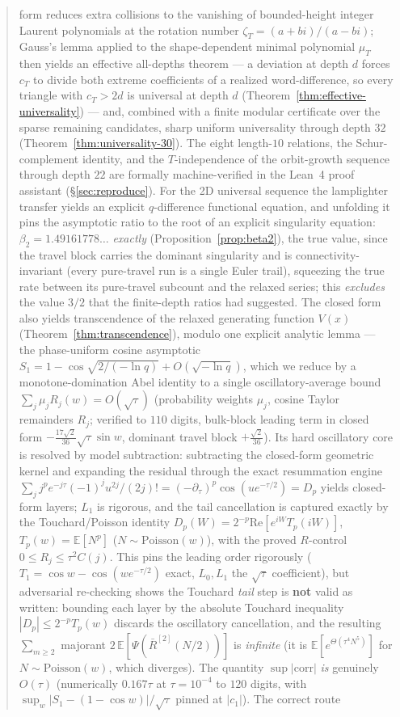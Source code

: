 \documentclass[11pt,a4paper]{article}
\theoremstyle{remark}
\theoremstyle{plain}
\begin{document}
\begin{abstract}
form reduces extra collisions to the vanishing of bounded-height integer Laurent polynomials at the rotation number $\zeta_T = (a+bi)/(a-bi)$; Gauss's lemma applied to the shape-dependent minimal polynomial $\mu_T$ then yields an effective all-depths theorem --- a deviation at depth $d$ forces $c_T$ to divide both extreme coefficients of a realized word-difference, so every triangle with $c_T > 2d$ is universal at depth $d$ (Theorem~\ref{thm:effective-universality}) --- and, combined with a finite modular certificate over the sparse remaining candidates, sharp uniform universality through depth $32$ (Theorem~\ref{thm:universality-30}).  The eight length-$10$ relations, the Schur-complement identity, and the $T$-independence of the orbit-growth sequence through depth $22$ are formally machine-verified in the Lean~4 proof assistant (\S\ref{sec:reproduce}).  For the 2D universal sequence the lamplighter transfer yields an explicit $q$-difference functional equation, and unfolding it pins the asymptotic ratio to the root of an explicit singularity equation: $\beta_2 = 1.49161778\ldots$ \emph{exactly} (Proposition~\ref{prop:beta2}), the true value, since the travel block carries the dominant singularity and is connectivity-invariant (every pure-travel run is a single Euler trail), squeezing the true rate between its pure-travel subcount and the relaxed series; this \emph{excludes} the value $3/2$ that the finite-depth ratios had suggested.  The closed form also yields transcendence of the relaxed generating function $V(x)$ (Theorem~\ref{thm:transcendence}), modulo one explicit analytic lemma --- the phase-uniform cosine asymptotic $S_1 = 1 - \cos\sqrt{2/(-\ln q)} + O(\sqrt{-\ln q})$, which we reduce by a monotone-domination Abel identity to a single oscillatory-average bound $\sum_j \mu_j R_j(w) = O(\sqrt\tau)$ (probability weights $\mu_j$, cosine Taylor remainders $R_j$; verified to $110$ digits, bulk-block leading term in closed form $-\tfrac{17\sqrt2}{36}\sqrt\tau\sin w$, dominant travel block $+\tfrac{\sqrt2}{36}$).  Its hard oscillatory core is resolved by model subtraction: subtracting the closed-form geometric kernel and expanding the residual through the exact resummation engine $\sum_j j^p e^{-j\tau}(-1)^j u^{2j}/(2j)! = (-\partial_\tau)^p\cos(u e^{-\tau/2}) = D_p$ yields closed-form layers; $L_1$ is rigorous, and the tail cancellation is captured exactly by the Touchard/Poisson identity $D_p(W)=2^{-p}\mathrm{Re}[e^{iW}T_p(iW)]$, $T_p(w)=\mathbb E[N^p]$ ($N\sim\mathrm{Poisson}(w)$), with the proved $R$-control $0\le R_j\le\tau^2 C(j)$.  This pins the leading order rigorously ($T_1=\cos w-\cos(we^{-\tau/2})$ exact, $L_0,L_1$ the $\sqrt\tau$ coefficient), but adversarial re-checking shows the Touchard \emph{tail} step is \textbf{not} valid as written: bounding each layer by the absolute Touchard inequality $|D_p|\le2^{-p}T_p(w)$ discards the oscillatory cancellation, and the resulting $\sum_{m\ge2}$ majorant $2\,\mathbb E[\Psi(\bar R^{[2]}(N/2))]$ is \emph{infinite} (it is $\mathbb E[e^{\Theta(\tau^4 N^5)}]$ for $N\sim\mathrm{Poisson}(w)$, which diverges).  The quantity $\sup|\mathrm{corr}|$ \emph{is} genuinely $O(\tau)$ (numerically $0.167\tau$ at $\tau=10^{-4}$ to $120$ digits, with $\sup_w|S_1-(1-\cos w)|/\sqrt\tau$ pinned at $|c_1|$). The correct route 
\end{abstract}
\end{document}
